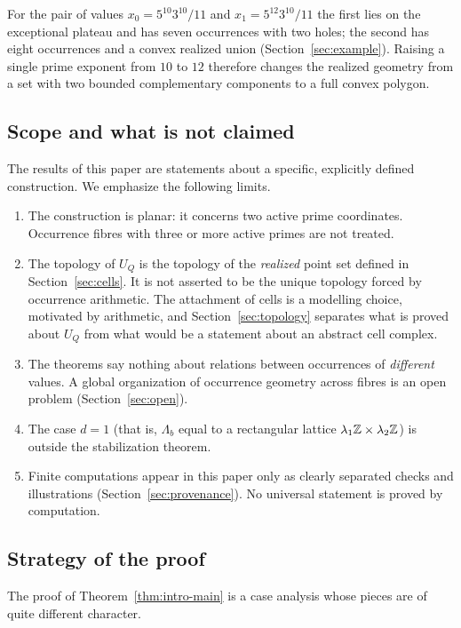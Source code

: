 For the pair of values $x_0=5^{10}3^{10}/11$ and $x_1=5^{12}3^{10}/11$ the first lies on the exceptional plateau and has seven occurrences with two holes; the second has eight occurrences and a convex realized union (Section~\ref{sec:example}). Raising a single prime exponent from $10$ to $12$ therefore changes the realized geometry from a set with two bounded complementary components to a full convex polygon.

\subsection{Scope and what is not claimed}

The results of this paper are statements about a specific, explicitly defined construction. We emphasize the following limits.

\begin{enumerate}
\item The construction is planar: it concerns two active prime coordinates. Occurrence fibres with three or more active primes are not treated.
\item The topology of $U_Q$ is the topology of the \emph{realized} point set defined in Section~\ref{sec:cells}. It is not asserted to be the unique topology forced by occurrence arithmetic. The attachment of cells is a modelling choice, motivated by arithmetic, and Section~\ref{sec:topology} separates what is proved about $U_Q$ from what would be a statement about an abstract cell complex.
\item The theorems say nothing about relations between occurrences of \emph{different} values. A global organization of occurrence geometry across fibres is an open problem (Section~\ref{sec:open}).
\item The case $d=1$ (that is, $\Lambda_b$ equal to a rectangular lattice $\lambda_1\mathbb Z\times\lambda_2\mathbb Z$) is outside the stabilization theorem.
\item Finite computations appear in this paper only as clearly separated checks and illustrations (Section~\ref{sec:provenance}). No universal statement is proved by computation.
\end{enumerate}

\subsection{Strategy of the proof}

The proof of Theorem~\ref{thm:intro-main} is a case analysis whose pieces are of quite different character.

